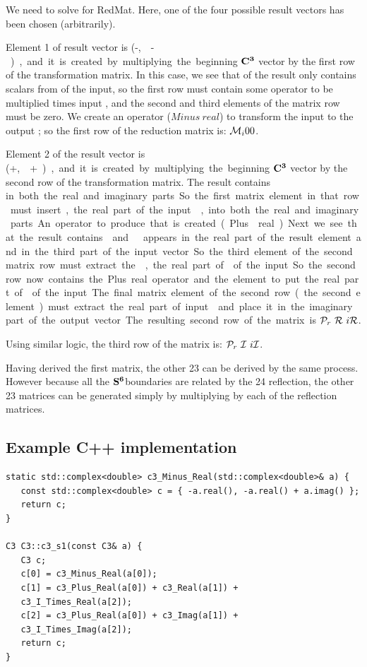 \documentclass[preprint]{iucr}              %
\numberwithin{equation}{section}
\newcommand{\SVI}[0]{$\bf{S^{6}}$}
\newcommand{\CIII}[0]{$\bf{C^{3}}$}
\newcommand{\Imaginary}[0]{\mathcal{I}}
\newcommand{\Real}[0]{\mathcal{R}}
\begin{document}
We need to solve for RedMat.
Here, one of the four possible result vectors has been chosen 
(arbitrarily). 

Element 1 of result vector is (-\si,~\siv-\si ), and
it is created by multiplying the beginning \CIII{} vector by the
first row of the transformation matrix. In this case, we see
that \ci of the result only contains scalars from \ci of
the input, so the first row must contain some operator to
be multiplied times input \ci, and the second and third
elements of the matrix row must be zero. We create an operator
($Minus~real$) to transform the input \ci to the output \ci; so
the first row of the reduction matrix is: $\mathcal{M}{}_i	 0		 0$. 

Element 2 of the result vector is (\siii+\si,~\sii+\si),
and
it is created by multiplying the beginning \CIII{} vector by the
second row of the transformation matrix. The result \cii
contains \si in both the real and imaginary parts. So
the first matrix element in that row must insert \si, the
real part of the input \ci, into both the real and imaginary
parts. An operator to produce that is created 
(Plus{}~real). Next we see that the result contains \sii and \siii.
\siii appears in the real part of the result element and in the
third part of the input vector. So the third element of the 
second matrix row must extract the \siii, the real part of 
\ciii of the input. So the second row now contains the Plus real
operator and the element to put the  real part of \ciii of the input.
The final matrix element of the second row (the second element)
must extract the real part of input \cii and place it in the
imaginary part of the output vector. The resulting second
row of the matrix is $\Plus_r~\Real~i\Real$.

Using similar logic, the third row of the matrix is:
$\Plus_r~\Imaginary~i\Imaginary$.

Having derived the first matrix, the other 23 can
be derived by the same process. However because all the
\SVI boundaries are related by the 24 reflection, the
other 23 matrices can be generated simply
by multiplying by each of the reflection matrices.

\subsection{Example C++ implementation}

\begin{verbatim}
static std::complex<double> c3_Minus_Real(std::complex<double>& a) {
   const std::complex<double> c = { -a.real(), -a.real() + a.imag() };
   return c;
}
	
C3 C3::c3_s1(const C3& a) {
   C3 c;
   c[0] = c3_Minus_Real(a[0]);
   c[1] = c3_Plus_Real(a[0]) + c3_Real(a[1]) +
   c3_I_Times_Real(a[2]);
   c[2] = c3_Plus_Real(a[0]) + c3_Imag(a[1]) +
   c3_I_Times_Imag(a[2]);
   return c;
}
\end{verbatim}
\end{document}
